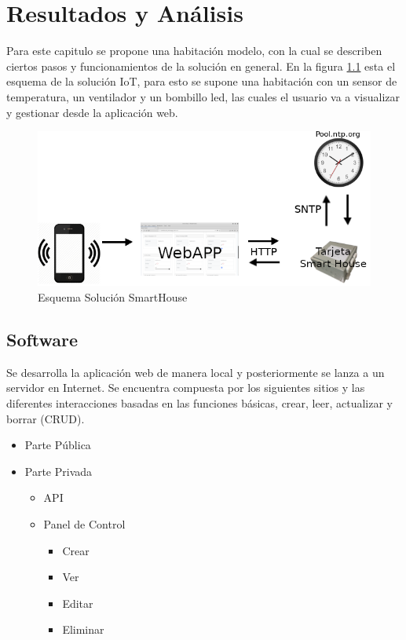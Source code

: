 \chapter{Resultados y Análisis}

Para este capitulo se propone una habitación modelo, con la cual se describen ciertos pasos y funcionamientos de la solución en general. En la figura \ref{fig:iot} esta el esquema de la solución IoT, para esto se supone una habitación con un sensor de temperatura, un ventilador y un bombillo led, las cuales el usuario va a visualizar y gestionar desde la aplicación web.

\begin{figure}[H]
	\centering
	\caption{Esquema Solución SmartHouse}
	\label{fig:iot}
	\includegraphics[width=0.6\linewidth]{Imagenes/IOT}
\end{figure}


\section{Software}

Se desarrolla la aplicación web de manera local y posteriormente se lanza a un servidor en Internet. Se encuentra compuesta por los siguientes sitios y las diferentes interacciones basadas en las funciones básicas, crear, leer, actualizar y borrar (CRUD).

\begin{itemize}
	\item Parte Pública
	\item Parte Privada
	\begin{itemize}
		\item API
		\item Panel de Control
		\begin{itemize}
			\item Crear
			\item Ver
			\item Editar
			\item Eliminar 
		\end{itemize}
	\end{itemize}
\end{itemize}

